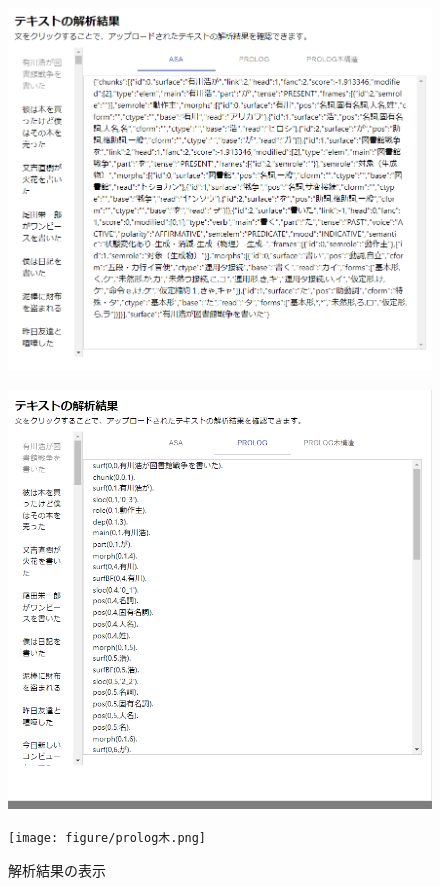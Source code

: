\begin{description}
\begin{figure}[htbp]
 \begin{minipage}[b]{0.45\linewidth}
    \centering
    \includegraphics[scale=.4]{figure/asa_results.png}
  \label{figure:3-1}
  \end{minipage}
  \begin{minipage}[b]{0.45\linewidth}
    \centering
    \includegraphics[keepaspectratio, scale=0.4]{figure/prolog.png}
    \label{figure:3-1}
  \end{minipage}
  \begin{minipage}[b]{0.45\linewidth}
    \centering
    \texttt{[image: figure/prolog木.png]}
    \label{figure:3-2}
  \end{minipage}
  \caption{解析結果の表示}\label{corpus_results}
\end{figure}



\end{description}
